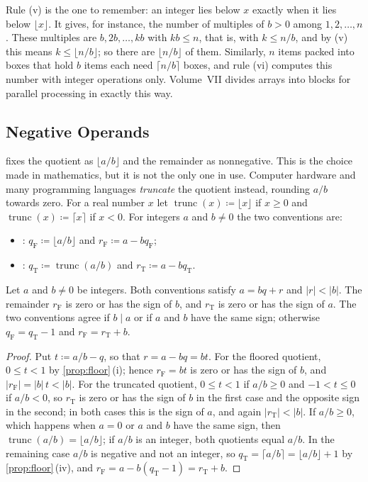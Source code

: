 Rule (v) is the one to remember: an integer lies below $x$ exactly when it lies below $\lfloor x\rfloor$. It gives, for instance, the number of multiples of $b>0$ among $1,2,\ldots,n$. These multiples are $b,2b,\ldots,kb$ with $kb\le n$, that is, with $k\le n/b$, and by (v) this means $k\le\lfloor n/b\rfloor$; so there are $\lfloor n/b\rfloor$ of them. Similarly, $n$ items packed into boxes that hold $b$ items each need $\lceil n/b\rceil$ boxes, and rule (vi) computes this number with integer operations only. Volume~VII divides arrays into blocks for parallel processing in exactly this way.

\subsection{Negative Operands}

 fixes the quotient as $\lfloor a/b\rfloor$ and the remainder as nonnegative. This is the choice made in mathematics, but it is not the only one in use. Computer hardware and many programming languages \emph{truncate} the quotient instead, rounding $a/b$ towards zero. For a real number $x$ let $\operatorname{trunc}(x)\coloneqq\lfloor x\rfloor$ if $x\ge0$ and $\operatorname{trunc}(x)\coloneqq\lceil x\rceil$ if $x<0$. For integers $a$ and $b\ne0$ the two conventions are:
\begin{itemize}
\item {}: $q_{\mathrm F}\coloneqq\lfloor a/b\rfloor$ and $r_{\mathrm F}\coloneqq a-bq_{\mathrm F}$;
\item {}: $q_{\mathrm T}\coloneqq\operatorname{trunc}(a/b)$ and $r_{\mathrm T}\coloneqq a-bq_{\mathrm T}$.
\end{itemize}

\begin{proposition}
\label{prop:trunc-floor}
Let $a$ and $b\ne0$ be integers. Both conventions satisfy $a=bq+r$ and $|r|<|b|$. The remainder $r_{\mathrm F}$ is zero or has the sign of $b$, and $r_{\mathrm T}$ is zero or has the sign of $a$. The two conventions agree if $b\mid a$ or if $a$ and $b$ have the same sign; otherwise $q_{\mathrm F}=q_{\mathrm T}-1$ and $r_{\mathrm F}=r_{\mathrm T}+b$.
\end{proposition}

\begin{proof}
Put $t\coloneqq a/b-q$, so that $r=a-bq=bt$. For the floored quotient, $0\le t<1$ by \cref{prop:floor}\,(i); hence $r_{\mathrm F}=bt$ is zero or has the sign of $b$, and $|r_{\mathrm F}|=|b|\,t<|b|$. For the truncated quotient, $0\le t<1$ if $a/b\ge0$ and $-1<t\le0$ if $a/b<0$, so $r_{\mathrm T}$ is zero or has the sign of $b$ in the first case and the opposite sign in the second; in both cases this is the sign of $a$, and again $|r_{\mathrm T}|<|b|$. If $a/b\ge0$, which happens when $a=0$ or $a$ and $b$ have the same sign, then $\operatorname{trunc}(a/b)=\lfloor a/b\rfloor$; if $a/b$ is an integer, both quotients equal $a/b$. In the remaining case $a/b$ is negative and not an integer, so $q_{\mathrm T}=\lceil a/b\rceil=\lfloor a/b\rfloor+1$ by \cref{prop:floor}\,(iv), and $r_{\mathrm F}=a-b(q_{\mathrm T}-1)=r_{\mathrm T}+b$.
\end{proof}

